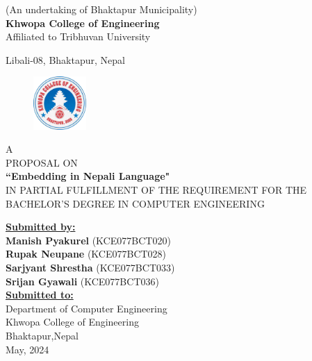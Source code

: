 \begin{center}
	\thispagestyle{empty}
	 \normalsize(An undertaking of Bhaktapur Municipality)\\
	 \Large\textbf{Khwopa College of Engineering}\\
	 \normalsize Affiliated to Tribhuvan University\\
	\normalsize{{{Libali-08, Bhaktapur, Nepal}}\\[0.75cm]

	\begin{figure}[h!]
		\centering
			\includegraphics[width=0.18\textwidth]{img/khwopa logo hd.png}
	\end{figure}
	\large{A \\PROPOSAL ON\\\textbf{``Embedding in Nepali Language"}}\\\vspace{0.1in}
	 \normalsize{IN PARTIAL FULFILLMENT OF THE REQUIREMENT
FOR THE BACHELOR’S DEGREE IN COMPUTER ENGINEERING} \\[0.65cm]
 
\vspace*{1cm}
	
	\large\textbf{\underline{Submitted by:}}\\
	
{\bf Manish Pyakurel} (KCE077BCT020)\\
{\bf Rupak Neupane} (KCE077BCT028)\\
{\bf Sarjyant Shrestha} (KCE077BCT033)\\
{\bf Srijan Gyawali} (KCE077BCT036)\\[0.75cm]

	\large\textbf{\underline{Submitted to:}}\\

\large Department of Computer Engineering\\
\large Khwopa College of Engineering\\
\large Bhaktapur,Nepal\\[0.75cm]
\large{May, 2024}
}
\end{center}